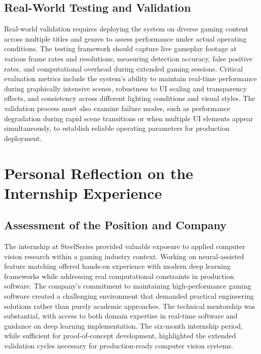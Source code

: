 \subsection{Real-World Testing and Validation}
Real-world validation requires deploying the system on diverse gaming content across multiple titles and genres to assess performance under actual operating conditions. The testing framework should capture live gameplay footage at various frame rates and resolutions, measuring detection accuracy, false positive rates, and computational overhead during extended gaming sessions. Critical evaluation metrics include the system's ability to maintain real-time performance during graphically intensive scenes, robustness to UI scaling and transparency effects, and consistency across different lighting conditions and visual styles. The validation process must also examine failure modes, such as performance degradation during rapid scene transitions or when multiple UI elements appear simultaneously, to establish reliable operating parameters for production deployment.

\section{Personal Reflection on the Internship Experience}
\subsection{Assessment of the Position and Company}
The internship at SteelSeries provided valuable exposure to applied computer vision research within a gaming industry context. Working on neural-assisted feature matching offered hands-on experience with modern deep learning frameworks while addressing real computational constraints in production software. The company's commitment to maintaining high-performance gaming software created a challenging environment that demanded practical engineering solutions rather than purely academic approaches.
The technical mentorship was substantial, with access to both domain expertise in real-time software and guidance on deep learning implementation. The six-month internship period, while sufficient for proof-of-concept development, highlighted the extended validation cycles necessary for production-ready computer vision systems.
